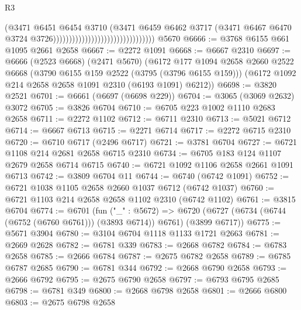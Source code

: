 \begin{lexlean}{R3}
\begin{coremodule}
                                                              (@3471
                                                                @6451
                                                                @6454
                                                                @3710
                                                                (@3471
                                                                  @6459
                                                                  @6462
                                                                  @3717
                                                                  (@3471
                                                                    @6467
                                                                    @6470
                                                                    @3724
                                                                    @3726))))))))))))))))))))))))))))))))
    @5670
@6666 := @3768 @6155 @661 @1095 @2661 @2658
@6667 := @2272 @1091
@6668 := @6667 @2310
@6697 := @6666
    (@2523 @6668)
    (@2471 @5670)
    (@6172
      @177
      @1094
      @2658
      @2660
      @2522
      @6668
      (@3790 @6155 @159 @2522 (@3795 (@3796 @6155 @159)))
      (@6172 @1092 @214 @2658 @2658 @1091 @2310 (@6193 @1091) @6212))
@6698 := @3820 @2521
@6701 := @6661 (@6697 (@6698 @229))
@6704 := @3065 (@3069 @2632) @3072
@6705 := @3826 @6704
@6710 := @6705 @223 @1002 @1110 @2683 @2658
@6711 := @2272 @1102
@6712 := @6711 @2310
@6713 := @5021 @6712
@6714 := @6667 @6713
@6715 := @2271 @6714
@6717 := @2272 @6715 @2310
@6720 := @6710 @6717 (@2496 @6717)
@6721 := @3781 @6704
@6727 := @6721 @1108 @214 @2681 @2658 @6715 @2310
@6734 := @6705 @183 @124 @1107 @2679 @2658 @6714 @6715
@6740 := @6721 @1092 @1106 @2658 @2661 @1091 @6713
@6742 := @3809 @6704 @11
@6744 := @6740 (@6742 @1091)
@6752 := @6721 @1038 @1105 @2658 @2660 @1037 @6712 (@6742 @1037)
@6760 := @6721 @1103 @214 @2658 @2658 @1102 @2310 (@6742 @1102)
@6761 := @3815 @6704
@6774 := @6701
    (fun ("_" : @5672) =>
    @6720 (@6727 (@6734 (@6744 (@6752 (@6760 @6761))) (@3893 @6714)) @6761) (@3899 @6717))
@6775 := @5671 @3904
@6780 := @3104 @6704 @1118 @1133 @1721 @2663
@6781 := @2669 @2628
@6782 := @6781 @339
@6783 := @2668 @6782
@6784 := @6783 @2658
@6785 := @2666 @6784
@6787 := @2675 @6782 @2658
@6789 := @6785 @6787 @2685
@6790 := @6781 @344
@6792 := @2668 @6790 @2658
@6793 := @2666 @6792
@6795 := @2675 @6790 @2658
@6797 := @6793 @6795 @2685
@6798 := @6781 @349
@6800 := @2668 @6798 @2658
@6801 := @2666 @6800
@6803 := @2675 @6798 @2658

\end{coremodule}
\end{lexlean}
